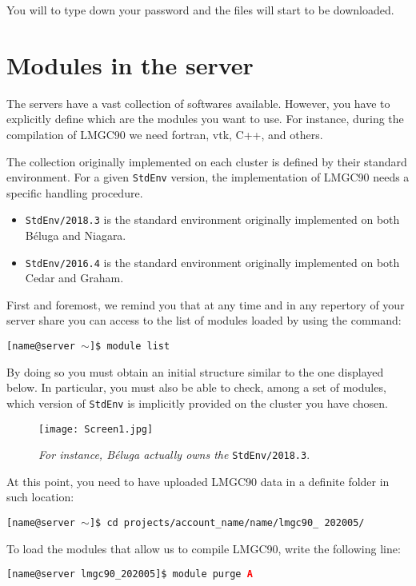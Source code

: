 \documentclass[12pt]{article}
\begin{document}
You will to type down your password and the files will start to be downloaded.


\section*{Modules in the server}
The servers have a vast collection of softwares available. However, you have to explicitly define which are the modules you want to use. For instance, during the compilation of LMGC90 we need fortran, vtk, C++, and others.

The collection originally implemented on each cluster is defined by their standard environment. For a given \texttt{StdEnv} version, the implementation of LMGC90 needs a specific handling procedure.
\begin{itemize}
    \item \texttt{StdEnv/2018.3} is the standard environment originally implemented on both Béluga and Niagara.
    \item \texttt{StdEnv/2016.4} is the standard environment originally implemented on both Cedar and Graham.
\end{itemize}


First and foremost, we remind you that at any time and in any repertory of your server share you can access to the list of modules loaded by using the command:

\begin{tcolorbox}
\texttt{[name@server $\sim$]\$ module list}
\end{tcolorbox}

By doing so you must obtain an initial structure similar to the one displayed below. In particular, you must also be able to check, among a set of modules, which version of \texttt{StdEnv} is implicitly provided on the cluster you have chosen.
\begin{figure}[H]
  \centering
  \texttt{[image: Screen1.jpg]}
  \caption*{\textit{For instance, Béluga actually owns the} \texttt{StdEnv/2018.3}.}
\end{figure}
\vspace{-0.4cm}
At this point, you need to have uploaded LMGC90 data in a definite folder in such location:
\begin{tcolorbox}
\texttt{[name@server $\sim$]\$ cd projects/account\_name/name/lmgc90\_ 202005/}
\end{tcolorbox}

\vspace{0.5cm}
To load the modules that allow us to compile LMGC90, write the following line:
\begin{tcolorbox}
\texttt{[name@server lmgc90\_202005]\$ module purge \textcolor{red}{\textbf{A}}} 
\end{tcolorbox}
\vspace{0.5cm}
\end{document}
